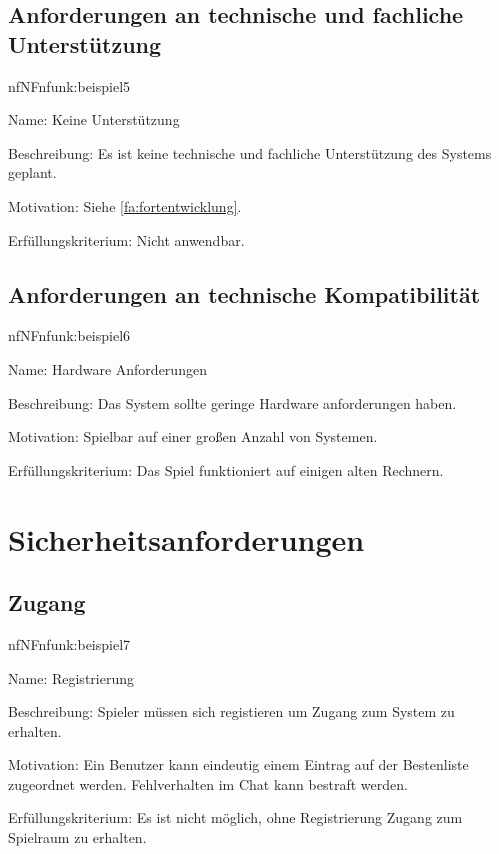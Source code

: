 \subsection{Anforderungen an technische und fachliche Unterstützung}

\begin{description}[leftmargin=5em, style=sameline]	
	\begin{lhp}{nf}{NF}{nfunk:beispiel5}
		\item [Name:] {Keine Unterstützung} %
		\item [Beschreibung:] Es ist keine technische und fachliche Unterstützung des Systems geplant.
		\item [Motivation:] Siehe \ref{fa:fortentwicklung}.
		\item [Erfüllungskriterium:] Nicht anwendbar.
	\end{lhp}
\end{description}

\subsection{Anforderungen an technische Kompatibilität}

\begin{description}[leftmargin=5em, style=sameline]	
	\begin{lhp}{nf}{NF}{nfunk:beispiel6}
		\item [Name:] {Hardware Anforderungen}
		\item [Beschreibung:] {Das System sollte geringe Hardware anforderungen haben.}
		\item [Motivation:] {Spielbar auf einer großen Anzahl von Systemen.}
		\item [Erfüllungskriterium:]
		{Das Spiel funktioniert auf einigen alten Rechnern}.
	\end{lhp}
\end{description}

\section{Sicherheitsanforderungen}

\subsection{Zugang}

\begin{description}[leftmargin=5em, style=sameline]	
	\begin{lhp}{nf}{NF}{nfunk:beispiel7}
		\item [Name:] {Registrierung}
		\item [Beschreibung:] {Spieler müssen sich registieren um Zugang zum System zu erhalten.}
		\item [Motivation:] {Ein Benutzer kann eindeutig einem Eintrag auf der Bestenliste zugeordnet werden. Fehlverhalten im Chat kann bestraft werden.}
		\item [Erfüllungskriterium:] {Es ist nicht möglich, ohne Registrierung Zugang zum Spielraum zu erhalten.}
	\end{lhp}
\end{description}

